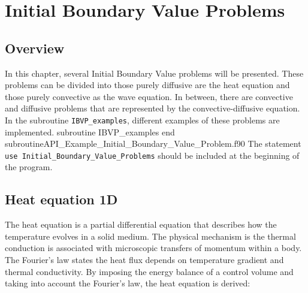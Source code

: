      
 \chapter{Initial Boundary Value Problems   }\label{user:IVBP}
\vspace{-1cm}
\section{Overview}
\vspace{-0.2cm} 
In this chapter, several Initial  Boundary Value problems will be presented. 
These problems can be divided into those purely diffusive are the heat equation and those purely convective as the wave equation. 
In between,  there are convective and diffusive problems that are represented by the convective-diffusive equation.
In the subroutine \verb|IBVP_examples|,  different examples of these problems are implemented.
\vspace{0.2cm} 
         {subroutine IBVP_examples}
         {end subroutine}{API_Example_Initial_Boundary_Value_Problem.f90}
\vspace{-0.2cm}
The statement
\verb|use Initial_Boundary_Value_Problems| should be included at the beginning of the program.


      
\section{Heat equation 1D}
The heat equation is a partial differential equation that describes how the temperature evolves in a solid medium. 
The physical mechanism is the thermal conduction is associated with microscopic transfers of momentum within a body. The Fourier's law states the heat flux depends on temperature gradient and thermal conductivity. By imposing the energy balance of a control volume and taking into account the Fourier's law, the heat equation is derived: 
   
